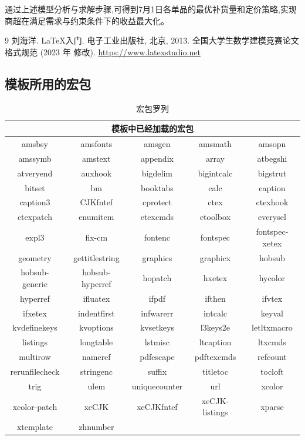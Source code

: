 \documentclass{cumcmthesis}
\begin{document}
通过上述模型分析与求解步骤,可得到7月1日各单品的最优补货量和定价策略,实现商超在满足需求与约束条件下的收益最大化。


\begin{thebibliography}{9}%
    刘海洋.
    \newblock \LaTeX {}入门\allowbreak[J].
    \newblock 电子工业出版社, 北京, 2013.
    全国大学生数学建模竞赛论文格式规范 (2023 年 修改).
     \url{https://www.latexstudio.net}
\end{thebibliography}

\newpage
\begin{appendices}

\section{模板所用的宏包}
\begin{table}[htbp]
    \centering
    \caption{宏包罗列}
    \begin{tabular}{ccccc}
        \toprule
        \multicolumn{5}{c}{模板中已经加载的宏包} \\
        \midrule
        amsbsy & amsfonts & {amsgen} & {amsmath} & {amsopn} \\
        amssymb & amstext & {appendix} & {array} & {atbegshi} \\
        atveryend & auxhook & {bigdelim} & {bigintcalc} & {bigstrut} \\
        bitset & bm    & {booktabs} & {calc} & {caption} \\
        caption3 & CJKfntef & {cprotect} & {ctex} & {ctexhook} \\
        ctexpatch & enumitem & {etexcmds} & {etoolbox} & {everysel} \\
        expl3 & fix-cm & {fontenc} & {fontspec} & {fontspec-xetex} \\
        geometry & gettitlestring & {graphics} & {graphicx} & {hobsub} \\
        hobsub-generic & hobsub-hyperref & {hopatch} & {hxetex} & {hycolor} \\
        hyperref & ifluatex & {ifpdf} & {ifthen} & {ifvtex} \\
        ifxetex & indentfirst & {infwarerr} & {intcalc} & {keyval} \\
        kvdefinekeys & kvoptions & {kvsetkeys} & {l3keys2e} & {letltxmacro} \\
        listings & longtable & {lstmisc} & {ltcaption} & {ltxcmds} \\
        multirow & nameref & {pdfescape} & {pdftexcmds} & {refcount} \\
        rerunfilecheck & stringenc & {suffix} & {titletoc} & {tocloft} \\
        trig  & ulem  & {uniquecounter} & {url} & {xcolor} \\
        xcolor-patch & xeCJK & {xeCJKfntef} & {xeCJK-listings} & {xparse} \\
        xtemplate & zhnumber &       &       &  \\
        \bottomrule
    \end{tabular}%
    \label{tab:addlabel}%
\end{table}%


\end{appendices}
\end{document}
